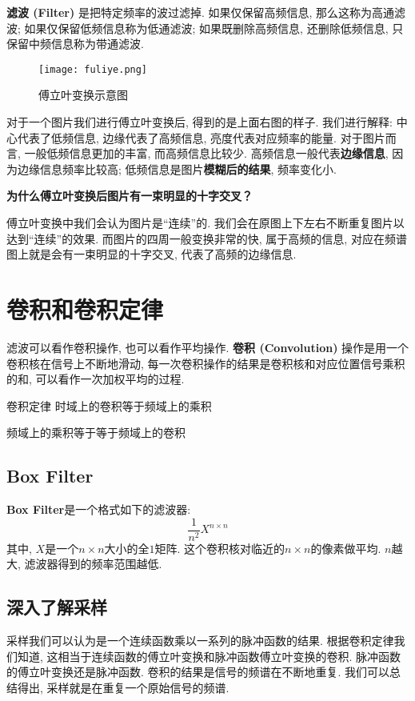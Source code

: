 \textbf{滤波 (Filter) }是把特定频率的波过滤掉. 如果仅保留高频信息, 那么这称为高通滤波; 如果仅保留低频信息称为低通滤波; 如果既删除高频信息, 还删除低频信息, 只保留中频信息称为带通滤波. 

\begin{figure}[H]
	\centering
	\texttt{[image: fuliye.png]}
	\caption{傅立叶变换示意图}
	\label{fig:fuliye}
\end{figure}
对于一个图片我们进行傅立叶变换后, 得到的是上面右图的样子. 我们进行解释: 中心代表了低频信息, 边缘代表了高频信息, 亮度代表对应频率的能量. 对于图片而言, 一般低频信息更加的丰富, 而高频信息比较少. 高频信息一般代表\textbf{边缘信息}, 因为边缘信息频率比较高; 低频信息是图片\textbf{模糊后的结果}, 频率变化小. 
\begin{question}
\textbf{为什么傅立叶变换后图片有一束明显的十字交叉？}

傅立叶变换中我们会认为图片是“连续”的. 我们会在原图上下左右不断重复图片以达到“连续”的效果. 而图片的四周一般变换非常的快, 属于高频的信息, 对应在频谱图上就是会有一束明显的十字交叉, 代表了高频的边缘信息. 
\end{question}

\section{卷积和卷积定律}
滤波可以看作卷积操作, 也可以看作平均操作. \textbf{卷积 (Convolution) }操作是用一个卷积核在信号上不断地滑动, 每一次卷积操作的结果是卷积核和对应位置信号乘积的和, 可以看作一次加权平均的过程. 

\begin{titledbox}{卷积定律}
	\centering 时域上的卷积等于频域上的乘积

    \centering 频域上的乘积等于等于频域上的卷积
\end{titledbox}

\subsection{Box Filter}
\textbf{Box Filter}是一个格式如下的滤波器: 
\begin{equation}
	\frac{1}{n^2} X^{n\times n}
\end{equation}
其中, $X$是一个$n \times n$大小的全$1$矩阵. 这个卷积核对临近的$n\times n$的像素做平均. $n$越大, 滤波器得到的频率范围越低. 

\subsection{深入了解采样}
采样我们可以认为是一个连续函数乘以一系列的脉冲函数的结果. 根据卷积定律我们知道, 这相当于连续函数的傅立叶变换和脉冲函数傅立叶变换的卷积. 脉冲函数的傅立叶变换还是脉冲函数. 卷积的结果是信号的频谱在不断地重复. 
我们可以总结得出, 采样就是在重复一个原始信号的频谱. 

